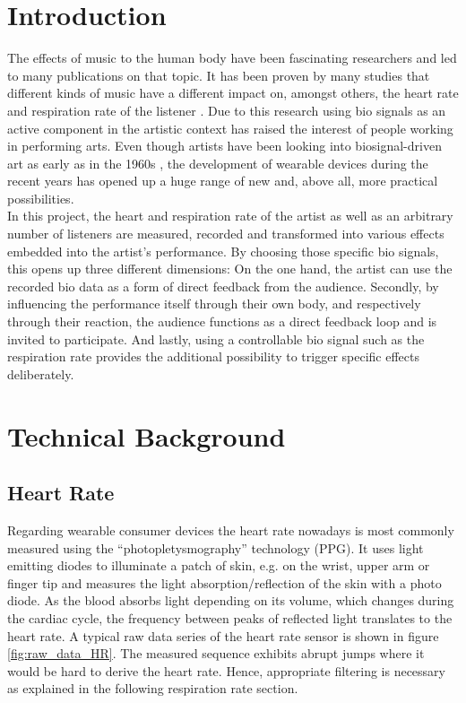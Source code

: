 \documentclass{sigchi-ext}
\begin{document}
\section{Introduction}
The effects of music to the human body have been fascinating researchers and led to
many publications on that topic. It has been proven by many studies that
different kinds of music have a different impact on, amongst others, the heart rate and
respiration rate of the listener \cite{dousty,shin,tsuroka,inesta2008heart}. Due to this research
using bio signals as an active component in the artistic context has raised the 
interest of people working in performing arts. Even though artists have been looking into 
biosignal-driven art as early as in the 1960s \cite{history_biosignal_art}, the development
of wearable devices during the recent years has opened up a huge range of new and, above
all, more practical possibilities. \\
In this project, the heart and respiration rate of the artist as well as an arbitrary number
of listeners are measured, recorded and transformed into various effects embedded into the
artist's performance. By choosing those specific bio signals, this opens up three different
dimensions: On the one hand, the artist can use the recorded bio data as a form of direct
feedback from the audience. Secondly, by influencing the performance itself through their
own body, and respectively through their reaction, the audience functions as a direct feedback
loop and is invited to participate. And lastly, using a controllable
bio signal such as the respiration rate provides the additional possibility to trigger specific
effects deliberately.

\section{Technical Background}

\subsection{Heart Rate}

Regarding wearable consumer devices the heart rate nowadays is most commonly measured using the ``photopletysmography'' technology 
(PPG). It uses light emitting diodes to illuminate a patch of skin, e.g. on the wrist, upper arm
or finger tip and measures the light absorption/reflection of the skin with a photo diode. As the blood absorbs light depending on
its volume, which changes during the cardiac cycle, the frequency between peaks of reflected light translates to the heart rate.
A typical raw data series of the heart rate sensor is shown in figure \ref{fig:raw_data_HR}. The measured sequence exhibits abrupt 
jumps where it would be hard to derive the heart rate. Hence, appropriate filtering is necessary as explained in the following 
respiration rate section.
\end{document}

